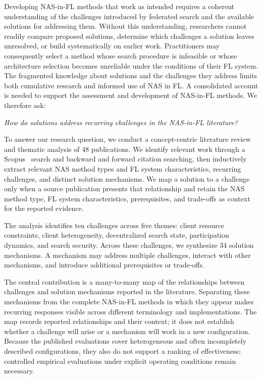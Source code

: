 Developing NAS-in-FL methods that work as intended requires a coherent understanding of the challenges introduced by federated search and the available solutions for addressing them. Without this understanding, researchers cannot readily compare proposed solutions, determine which challenges a solution leaves unresolved, or build systematically on earlier work. Practitioners may consequently select a method whose search procedure is infeasible or whose architecture selection becomes unreliable under the conditions of their FL system. The fragmented knowledge about solutions and the challenges they address limits both cumulative research and informed use of NAS in FL. A consolidated account is needed to support the assessment and development of NAS-in-FL methods. We therefore ask:

\begin{center}
\textit{How do solutions address recurring challenges in the NAS-in-FL literature?}
\end{center}

To answer our research question, we conduct a concept-centric literature review and thematic analysis of 48 publications. We identify relevant work through a Scopus~\cite{scopus} search and backward and forward citation searching, then inductively extract relevant NAS method types and FL system characteristics, recurring challenges, and distinct solution mechanisms. We map a solution to a challenge only when a source publication presents that relationship and retain the NAS method type, FL system characteristics, prerequisites, and trade-offs as context for the reported evidence.

The analysis identifies ten challenges across five themes: client resource constraints, client heterogeneity, decentralized search state, participation dynamics, and search security. Across these challenges, we synthesize 34 solution mechanisms. A mechanism may address multiple challenges, interact with other mechanisms, and introduce additional prerequisites or trade-offs.

The central contribution is a many-to-many map of the relationships between challenges and solution mechanisms reported in the literature. Separating these mechanisms from the complete NAS-in-FL methods in which they appear makes recurring responses visible across different terminology and implementations. The map records reported relationships and their context; it does not establish whether a challenge will arise or a mechanism will work in a new configuration. Because the published evaluations cover heterogeneous and often incompletely described configurations, they also do not support a ranking of effectiveness; controlled empirical evaluations under explicit operating conditions remain necessary.

